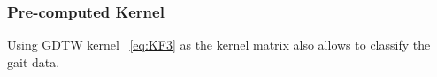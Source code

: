\documentclass{sig-alternate}
\begin{document}
\subsubsection{Pre-computed Kernel}
Using GDTW kernel ~\ref{eq:KF3} as the kernel matrix also allows to classify the gait data.


\end{document}
